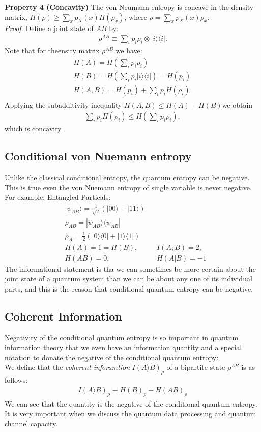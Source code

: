 \textbf{Property 4 (Concavity)}
The von Neumann entropy is concave in the density matrix, $H(\rho) \geq \sum_x p_X(x) H(\rho_x)$, where $\rho = \sum_x p_X(x)\rho_x$. \\
\textit{Proof.} Define a joint state of $AB$ by:
\begin{align*}
\rho^{AB} \equiv \sum_i p_i \rho_i \otimes |i\rangle \langle i|.
\end{align*}
Note that for theensity matrix $\rho^{AB}$ we have:
\begin{align*}
H(A)=H(\sum_i p_i \rho_i) \\
H(B)=H(\sum_i p_i |i \rangle \langle i|)=H(p_i) \\
H(A,B)=H(p_i)+\sum_i p_i H(\rho_i). \\
\end{align*}
Applying the subadditivity inequality $H(A,B) \leq H(A)+H(B)$we obtain
\begin{align*}
\sum_i p_i H(\rho_i) \leq H(\sum_i p_i \rho_i),
\end{align*}
which is concavity.

\subsection{Conditional von Nuemann entropy}
Unlike the classical conditional entropy, the quantum entropy can be negative. This is true even the von Nuemann entropy of single variable is never negative. \\
For example:
Entangled Particals:
\begin{align*}
& |\psi_{AB} \rangle = \frac{1}{\sqrt{2}}(|00\rangle + |11\rangle) \\
& \rho_{AB}= |\psi_{AB} \rangle \langle \psi_{AB}| \\
& \rho_A=\frac{1}{2}(|0\rangle \langle 0| + |1\rangle \langle 1|) \\
& H(A)=1=H(B), & &I(A;B)=2,  \\
& H(AB)=0, & &H(A|B)=-1 
\end{align*}
The informational statement is tha we can sometimes be more certain about the joint state of a quantum system than we can be about any one of its individual parts, and this is the reason that conditional  quantum entropy can be negative.

\subsection{Coherent Information}
Negativity of the conditional quantum entropy is so important in quantum information theory that we even have an information quantity and a special notation to donate the negative of the conditional quantum entropy:\\
We define that the \textit{coherent inforamtion} $I(A\rangle B)_{\rho}$ of a bipartite state $\rho^{AB}$ is as follows:
\begin{align*}
I(A\rangle B)_{\rho} \equiv H(B)_{\rho}-H(AB)_{\rho}
\end{align*}
We can see that the quantity is the negative of the conditional quantum entropy. It is very important when we discuss the quantum data processing and quantum channel capacity.

